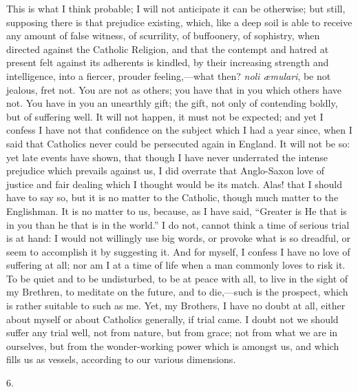 This is what I think probable; I will not anticipate
it can be otherwise; but still, supposing there is that prejudice existing, which, like a deep soil is able to
receive any amount of false witness, of scurrility, of
buffoonery, of sophistry, when directed against the
Catholic Religion, and that the contempt and hatred at
present felt against its adherents is kindled, by their
increasing strength and intelligence, into a fiercer,
prouder feeling,—what then? \emph{noli æmulari},
be not jealous, fret not. You are not as others; you have
that in you which others have not. You have in you an
unearthly gift; the gift, not only of contending boldly,
but of suffering well. It will not happen, it must not be
expected; and yet I confess I have not that confidence on
the subject which I had a year since, when I said that
Catholics never could be persecuted again in England. It
will not be so: yet late events have shown, that though I
have never underrated the intense prejudice which
prevails against us, I did overrate that Anglo-Saxon love
of justice and fair dealing which I thought would be its
match. Alas! that I should have to say so, but it is no
matter to the Catholic, though much matter to the
Englishman. It is no matter to us, because, as I have
said, ``Greater is He that is in you than he that is
in the world.'' I do not, cannot think a time of
serious trial is at hand: I would not willingly use big
words, or provoke what is so dreadful, or seem to
accomplish it by suggesting it. And for myself, I confess
I have no love of suffering at all; nor am I at a time of
life when a man commonly loves to risk it. To be quiet
and to be undisturbed, to be at peace with all, to live
in the sight of my Brethren, to meditate on the future,
and to die,—such is the prospect, which is rather
suitable to such as me. Yet, my Brothers, I have no doubt
at all, either about myself or about Catholics generally,
if trial came. I doubt not we should suffer any trial
well, not from nature, but from grace; not from what we
are in ourselves, but from the wonder-working power which
is amongst us, and which fills us as vessels, according
to our various dimensions.

6.

